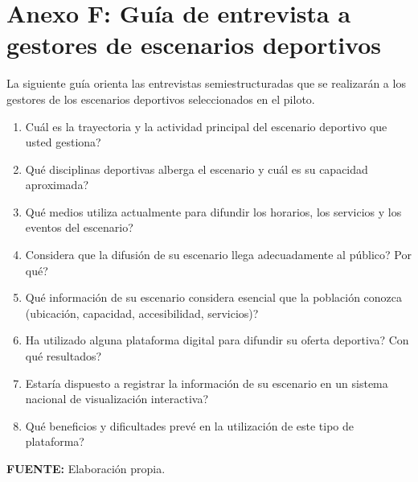 
\section{Anexo F: Gu\'ia de entrevista a gestores de escenarios deportivos}

La siguiente gu\'ia orienta las entrevistas semiestructuradas que se
realizar\'an a los gestores de los escenarios deportivos seleccionados en el
piloto.

\begin{enumerate}
  \item \textquestiondown Cu\'al es la trayectoria y la actividad principal del
        escenario deportivo que usted gestiona?
  \item \textquestiondown Qu\'e disciplinas deportivas alberga el escenario y
        cu\'al es su capacidad aproximada?
  \item \textquestiondown Qu\'e medios utiliza actualmente para difundir los
        horarios, los servicios y los eventos del escenario?
  \item \textquestiondown Considera que la difusi\'on de su escenario llega
        adecuadamente al p\'ublico? \textquestiondown Por qu\'e?
  \item \textquestiondown Qu\'e informaci\'on de su escenario considera esencial
        que la poblaci\'on conozca (ubicaci\'on, capacidad, accesibilidad,
        servicios)?
  \item \textquestiondown Ha utilizado alguna plataforma digital para difundir
        su oferta deportiva? \textquestiondown Con qu\'e resultados?
  \item \textquestiondown Estar\'ia dispuesto a registrar la informaci\'on de su
        escenario en un sistema nacional de visualizaci\'on interactiva?
  \item \textquestiondown Qu\'e beneficios y dificultades prev\'e en la
        utilizaci\'on de este tipo de plataforma?
\end{enumerate}

\textbf{FUENTE:} Elaboraci\'on propia.
